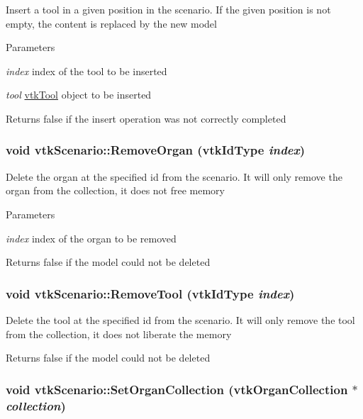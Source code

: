 Insert a tool in a given position in the scenario. If the given position is not empty, the content is replaced by the new model 
\begin{DoxyParams}{Parameters}
\item[{\em index}]index of the tool to be inserted \item[{\em tool}]\hyperlink{classvtkTool}{vtkTool} object to be inserted \end{DoxyParams}
\begin{DoxyReturn}{Returns}
false if the insert operation was not correctly completed 
\end{DoxyReturn}
\hypertarget{classvtkScenario_a8b78726133ade77ee874c0e9c4f8028a}{
\subsubsection[{RemoveOrgan}]{\setlength{\rightskip}{0pt plus 5cm}void vtkScenario::RemoveOrgan (vtkIdType {\em index})}}
\label{classvtkScenario_a8b78726133ade77ee874c0e9c4f8028a}


Delete the organ at the specified id from the scenario. It will only remove the organ from the collection, it does not free memory 
\begin{DoxyParams}{Parameters}
\item[{\em index}]index of the organ to be removed \end{DoxyParams}
\begin{DoxyReturn}{Returns}
false if the model could not be deleted 
\end{DoxyReturn}
\hypertarget{classvtkScenario_a720fbda74cc08ba3fe2929945a07ba83}{
\subsubsection[{RemoveTool}]{\setlength{\rightskip}{0pt plus 5cm}void vtkScenario::RemoveTool (vtkIdType {\em index})}}
\label{classvtkScenario_a720fbda74cc08ba3fe2929945a07ba83}


Delete the tool at the specified id from the scenario. It will only remove the tool from the collection, it does not liberate the memory \begin{DoxyReturn}{Returns}
false if the model could not be deleted 
\end{DoxyReturn}
\hypertarget{classvtkScenario_afff48d5fa445019c74d0ae9b6cc42376}{
\subsubsection[{SetOrganCollection}]{\setlength{\rightskip}{0pt plus 5cm}void vtkScenario::SetOrganCollection ({\bf vtkOrganCollection} $\ast$ {\em collection})}}
\label{classvtkScenario_afff48d5fa445019c74d0ae9b6cc42376}


